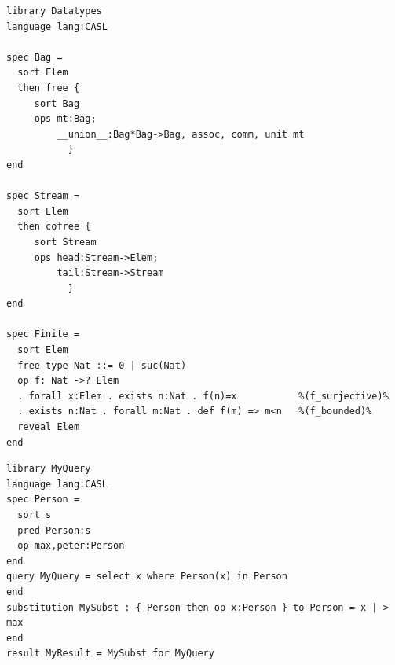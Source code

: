 \documentclass[10pt, a4paper]{isov2}
\newcommand*{\DOL}{\ensuremath{\mathsf{DOL}}\xspace}
\begin{document}
\label{ex:datatypes}

\begin{lstlisting}[basicstyle=\ttfamily,language=dolText,alsolanguage=CASL,escapechar=@,mathescape]
%prefix( lang:  <http://purl.net/DOL/languages/> )%
library Datatypes
language lang:CASL

spec Bag =
  sort Elem
  then free {
     sort Bag
     ops mt:Bag;
         __union__:Bag*Bag->Bag, assoc, comm, unit mt
           }
end

spec Stream =
  sort Elem
  then cofree {
     sort Stream
     ops head:Stream->Elem;
         tail:Stream->Stream
           }
end

spec Finite =
  sort Elem
  free type Nat ::= 0 | suc(Nat)
  op f: Nat ->? Elem
  . forall x:Elem . exists n:Nat . f(n)=x           %(f_surjective)%
  . exists n:Nat . forall m:Nat . def f(m) => m<n   %(f_bounded)%
  reveal Elem
end

\end{lstlisting}

\label{ex:queries}
\begin{lstlisting}[basicstyle=\ttfamily,language=dolText,alsolanguage=CASL,escapechar=@,mathescape]
%prefix( lang:  <http://purl.net/DOL/languages/> )%
library MyQuery
language lang:CASL
spec Person =
  sort s
  pred Person:s 
  op max,peter:Person
end
query MyQuery = select x where Person(x) in Person
end
substitution MySubst : { Person then op x:Person } to Person = x |-> max
end
result MyResult = MySubst for MyQuery
\end{lstlisting}



\cleardoublepage
\infannex{Tools for \DOL}\label{a:tools}

\end{document}
